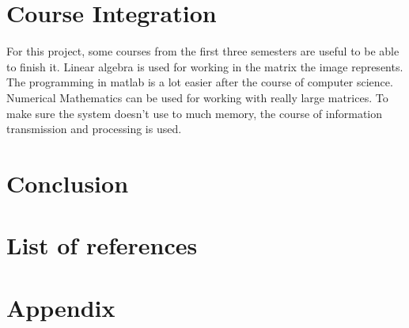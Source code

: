\documentclass[11pt]{article}
\begin{document}
\section{Course Integration}
For this project, some courses from the first three semesters are useful to be able to finish it. Linear algebra is used for working in the matrix the image represents. The programming in matlab is a lot easier after the course of computer science. Numerical Mathematics can be used for working with really large matrices. To make sure the system doesn't use to much memory, the course of information transmission and processing is used.

\section{Conclusion}

\section{List of references}
\printbibliography

\section{Appendix}
\end{document}
